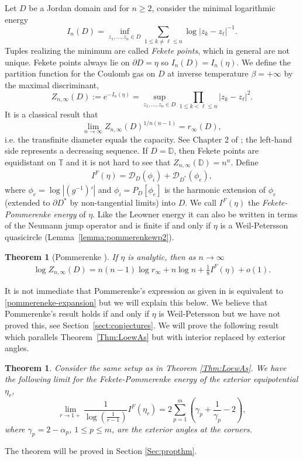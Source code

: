 \documentclass{article}
\numberwithin{equation}{section}
\numberwithin{figure}{section}
\theoremstyle{plain}
\theoremstyle{plain}
\numberwithin{thm}{section}
\newtheorem{theorem}[thm]{Theorem}
\theoremstyle{remark}
\newcommand{\T}{\mathbb{T}}
\newcommand{\D}{\mathbb{D}}
\let \le \leqslant
\let \ge \geqslant
\begin{document}
Let $D$ be a Jordan domain and for $n \ge 2$, consider the minimal logarithmic energy 
\[
 I_n(D) = \inf_{z_1,\ldots,z_n \in D} \sum_{1 \le k \neq  \ell \le n} \log |z_k-z_\ell|^{-1}.
\]
Tuples realizing the minimum are called \emph{Fekete points}, which in general are not unique. Fekete points always lie on $\partial D = \eta$ so $I_n(D) = I_n(\eta)$. We define the partition function for the Coulomb gas on $D$ at inverse temperature $\beta = +\infty$ by the maximal discriminant,
\[
Z_{n, \infty}(D) := e^{-I_n(\eta)} = \sup_{z_1,\ldots,z_n \in D} \prod_{1 \le k < \ell \le n} |z_k -z_\ell|^2.
\]
It is a classical result that 
\[
\lim_{n \to \infty} Z_{n, \infty}(D)^{1/n(n-1)} = r_\infty(D),
\]
i.e. the transfinite diameter equals the capacity.
See Chapter 2 of \cite{Ahl73}; the left-hand side represents a decreasing sequence.
If $D=\D$, then Fekete points are equidistant on $\T$ and it is not hard to see that $Z_{n, \infty}(\D) = n^n$. Define
\begin{align}\label{def:pommerenke-energy}
I^F(\eta) = \mathcal{D}_D(\phi_i) +  \mathcal{D}_{D^*}(\phi_e), 
\end{align}
where $\phi_e = \log|(g^{-1})'|$ and $\phi_i = P_D[\phi_e]$ is the harmonic extension of $\phi_e$ (extended to $\partial D^*$ by non-tangential limits) into $D$.  We call $I^F(\eta)$ the \emph{Fekete-Pommerenke energy} of $\eta$. Like the Leowner energy it can also be written in terms of the Neumann jump operator and is finite if and only if $\eta$ is a Weil-Petersson quasicircle (Lemma~\ref{lemma:pommerenkewp2}).
\begin{theorem}[Pommerenke \cite{pom67, pom69}]\label{thm:pomthm}
If $\eta$ is analytic, then as $n\to\infty$
    \begin{align}\label{pommereneke-expansion}
\log Z_{n, \infty}(D) = n(n-1) \log r_\infty  +  n\log n +  \frac{1}{8}I^F(\eta) + o(1).
\end{align}
\end{theorem}
It is not immediate that Pommerenke's expression as given in \cite{pom67, pom69} is equivalent to \eqref{pommereneke-expansion} but we will explain this below. We believe that Pommerenke's result holds if and only if $\eta$ is Weil-Petersson but we have not proved this, see Section~\ref{sect:conjectures}. We will prove the following result which parallels Theorem~\ref{Thm:LoewAs} but with interior replaced by exterior angles.
\begin{theorem}\label{Thm:PommEn}
    Consider the same setup as in Theorem \ref{Thm:LoewAs}. We have the following limit for the Fekete-Pommerenke energy of the exterior equipotential $\eta_r$,
\begin{equation}\label{PommEn}
    \lim_{r\to 1+}\frac{1}{\log(\frac 1{r-1})} I^F(\eta_r)=2\sum_{p=1}^m \left( \gamma_p+\frac 1{\gamma_p} -2 \right),
\end{equation}
where $\gamma_p=2-\alpha_p$, $1\le p\le m$, are the exterior angles at the corners.

\end{theorem}
The theorem will be proved in Section \ref{Sec:propthm}.
\end{document}
